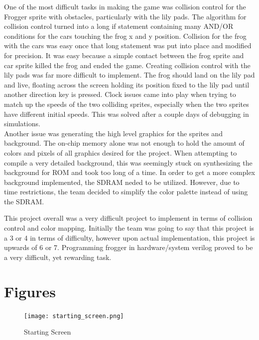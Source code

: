 \documentclass[journal, twocolumn, final,11pt,letterpaper]{IEEEtran}
\begin{document}
One of the most difficult tasks in making the game was collision control for the Frogger sprite with obstacles, particularly with the lily pads.  The algorithm for collision control turned into a long if statement containing many AND/OR conditions for the cars touching the frog x and y position.  Collision for the frog with the cars was easy once that long statement was put into place and modified for precision.  It was easy because a simple contact between the frog sprite and car sprite killed the frog and ended the game.  Creating collision control with the lily pads was far more difficult to implement.  The frog should land on the lily pad and live, floating across the screen holding its position fixed to the lily pad until another direction key is pressed.  Clock issues came into play when trying to match up the speeds of the two colliding sprites, especially when the two sprites have different initial speeds. This was solved after a couple days of debugging in simulations.  \\

Another issue was generating the high level graphics for the sprites and background.  The on-chip memory alone was not enough to hold the amount of colors and pixels of all graphics desired for the project. When attempting to compile a very detailed background, this was seemingly stuck on synthesizing the background for ROM and took too long of a time. In order to get a more complex background implemented, the SDRAM neded to be utilized. However, due to time restrictions, the team decided to simplify the color palette instead of using the SDRAM.

This project overall was a very difficult project to implement in terms of collision control and color mapping. Initially the team was going to say that this project is a 3 or 4 in terms of difficulty, however upon actual implementation, this project is upwards of 6 or 7. Programming frogger in hardware/system verilog proved to be a very difficult, yet rewarding task. 



\clearpage
\onecolumn
\section{Figures}

\begin{figure}[H]
	\centering
	\texttt{[image: starting\_screen.png]}
	\caption{Starting Screen}
	\label{fig:starting-screen}
\end{figure}
\end{document}
